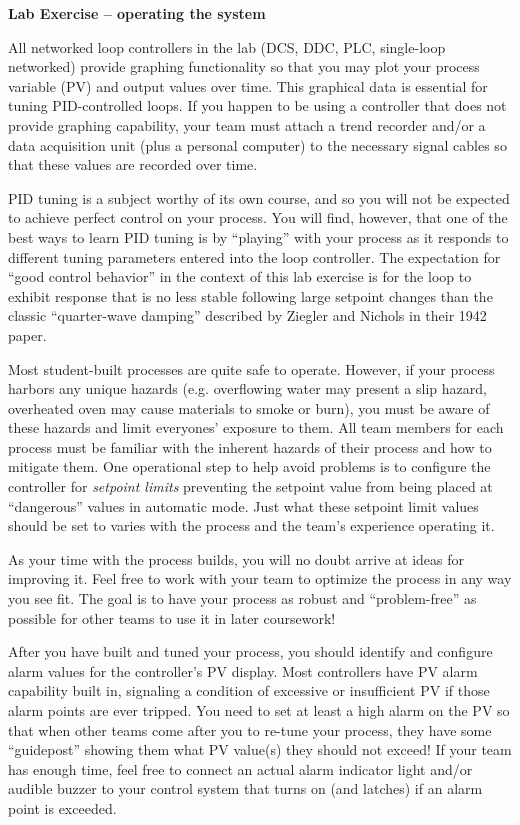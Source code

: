 \documentclass[12pt,a4paper]{article}
\begin{document}
\vfil \eject

\noindent
{\bf Lab Exercise -- operating the system}

\vskip 5pt

All networked loop controllers in the lab (DCS, DDC, PLC, single-loop networked) provide graphing functionality so that you may plot your process variable (PV) and output values over time.  This graphical data is essential for tuning PID-controlled loops.  If you happen to be using a controller that does not provide graphing capability, your team must attach a trend recorder and/or a data acquisition unit (plus a personal computer) to the necessary signal cables so that these values are recorded over time.

PID tuning is a subject worthy of its own course, and so you will not be expected to achieve perfect control on your process.  You will find, however, that one of the best ways to learn PID tuning is by ``playing'' with your process as it responds to different tuning parameters entered into the loop controller.  The expectation for ``good control behavior'' in the context of this lab exercise is for the loop to exhibit response that is no less stable following large setpoint changes than the classic ``quarter-wave damping'' described by Ziegler and Nichols in their 1942 paper.

\vskip 10pt

Most student-built processes are quite safe to operate.  However, if your process harbors any unique hazards (e.g. overflowing water may present a slip hazard, overheated oven may cause materials to smoke or burn), you must be aware of these hazards and limit everyones' exposure to them.  All team members for each process must be familiar with the inherent hazards of their process and how to mitigate them.  One operational step to help avoid problems is to configure the controller for {\it setpoint limits} preventing the setpoint value from being placed at ``dangerous'' values in automatic mode.  Just what these setpoint limit values should be set to varies with the process and the team's experience operating it.

As your time with the process builds, you will no doubt arrive at ideas for improving it.  Feel free to work with your team to optimize the process in any way you see fit.  The goal is to have your process as robust and ``problem-free'' as possible for other teams to use it in later coursework!

\vskip 10pt

After you have built and tuned your process, you should identify and configure alarm values for the controller's PV display.  Most controllers have PV alarm capability built in, signaling a condition of excessive or insufficient PV if those alarm points are ever tripped.  You need to set at least a high alarm on the PV so that when other teams come after you to re-tune your process, they have some ``guidepost'' showing them what PV value(s) they should not exceed!  If your team has enough time, feel free to connect an actual alarm indicator light and/or audible buzzer to your control system that turns on (and latches) if an alarm point is exceeded.
\end{document}

